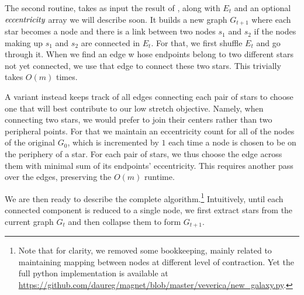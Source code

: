 The second routine, \collapseStar{} takes as input the result of \extractStar{}, along with $E_t$
and an optional $\emph{eccentricity}$ array we will describe soon. It builds a new graph $G_{t+1}$
where each star becomes a node and there is a link between two nodes $s_1$ and $s_2$ if the nodes
making up $s_1$ and $s_2$ are connected in $E_t$. For that, we first shuffle $E_t$ and go through
it. When we  find an edge w hose endpoints belong to two different stars not yet connected, we use
that edge to connect these two stars. This trivially takes $O(m)$ times.

A variant instead keeps track of all edges connecting each pair of stars to choose one that will
best contribute to our low stretch objective. Namely, when connecting two stars, we would prefer to
join their centers rather than two peripheral points. For that we maintain an eccentricity count for
all of the nodes of the original $G_0$, which is incremented by $1$ each time a node is chosen to be
on the periphery of a star.
For each pair of stars, we thus choose the edge across them with minimal sum of its endpoints'
eccentricity. This requires another pass over the edges, preserving the $O(m)$ runtime.

\bigskip

We are then ready to describe the complete \gtx{} algorithm.\footnote{Note that for clarity, we
removed some bookkeeping, mainly related to maintaining mapping between nodes at different level of
contraction. Yet the full python implementation is available at
\url{https://github.com/daureg/magnet/blob/master/veverica/new_galaxy.py}.} Intuitively, until each
connected component is reduced to a single node, we first extract stars from the current graph $G_t$
and then collapse them to form $G_{t+1}$.
